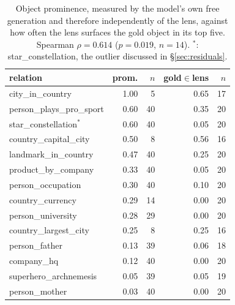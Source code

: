 \begin{table}[t]
\centering\footnotesize
\begin{tabular}{@{}lrrrr@{}}
\toprule
relation & prom. & $n$ & gold$\in$lens & $n$ \\
\midrule
city\_in\_country & 1.00 & 5 & 0.65 & 17 \\
person\_plays\_pro\_sport & 0.60 & 40 & 0.35 & 20 \\
star\_constellation$^{*}$ & 0.60 & 40 & 0.05 & 20 \\
country\_capital\_city & 0.50 & 8 & 0.56 & 16 \\
landmark\_in\_country & 0.47 & 40 & 0.25 & 20 \\
product\_by\_company & 0.33 & 40 & 0.05 & 20 \\
person\_occupation & 0.30 & 40 & 0.10 & 20 \\
country\_currency & 0.29 & 14 & 0.00 & 20 \\
person\_university & 0.28 & 29 & 0.00 & 20 \\
country\_largest\_city & 0.25 & 8 & 0.25 & 16 \\
person\_father & 0.13 & 39 & 0.06 & 18 \\
company\_hq & 0.12 & 40 & 0.00 & 20 \\
superhero\_archnemesis & 0.05 & 39 & 0.05 & 19 \\
person\_mother & 0.03 & 40 & 0.00 & 20 \\
\bottomrule
\end{tabular}
\caption{Object prominence, measured by the model's own free
generation and therefore independently of the lens, against how often
the lens surfaces the gold object in its top five. Spearman
$\rho = 0.614$ ($p = 0.019$, $n = 14$).
$^{*}$: star\_constellation, the outlier discussed in \S\ref{sec:residuals}.}
\label{tab:prominence}
\end{table}
